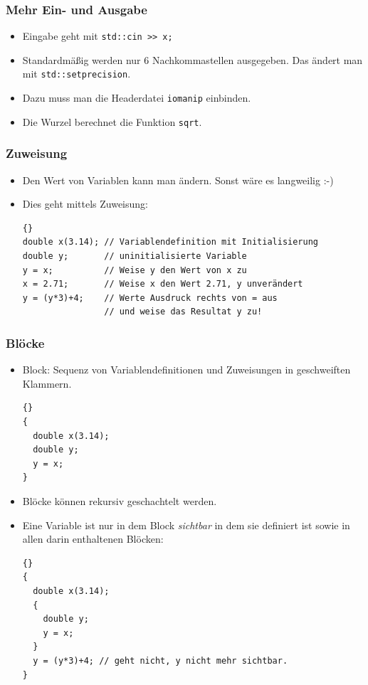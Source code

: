 \documentclass[ignorenonframetext,12pt]{beamer}
\theoremstyle{definition}
\theoremstyle{definition}
\begin{document}
\begin{frame}[fragile]
\frametitle{Mehr Ein- und Ausgabe}

\begin{itemize}
\item Eingabe geht mit \lstinline{std::cin >> x;}
\item Standardmäßig werden nur 6 Nachkommastellen ausgegeben. Das
  ändert man mit \lstinline{std::setprecision}.
\item Dazu muss man die Headerdatei \lstinline{iomanip} einbinden.
\item Die Wurzel berechnet die Funktion \lstinline{sqrt}.
\end{itemize}
\end{frame}

\begin{frame}[fragile]
\frametitle{Zuweisung}
\begin{itemize}
\item Den Wert von Variablen kann man ändern. Sonst wäre es langweilig
  :-)
\item Dies geht mittels Zuweisung:
{\scriptsize\begin{lstlisting}{}
double x(3.14); // Variablendefinition mit Initialisierung
double y;       // uninitialisierte Variable
y = x;          // Weise y den Wert von x zu
x = 2.71;       // Weise x den Wert 2.71, y unverändert
y = (y*3)+4;    // Werte Ausdruck rechts von = aus
                // und weise das Resultat y zu!
\end{lstlisting}}
\end{itemize}
\end{frame}

\begin{frame}[fragile]
\frametitle{Blöcke}
\begin{itemize}
\item Block: Sequenz von Variablendefinitionen und Zuweisungen in
  geschweiften Klammern.
{\scriptsize\begin{lstlisting}{}
{
  double x(3.14);
  double y;
  y = x;
}
\end{lstlisting}}
\item Blöcke können rekursiv geschachtelt werden.
\item Eine Variable ist nur in dem Block \textsl{sichtbar} in dem sie
  definiert ist sowie in allen darin enthaltenen Blöcken:
{\scriptsize\begin{lstlisting}{}
{
  double x(3.14);
  {
    double y;
    y = x;
  }
  y = (y*3)+4; // geht nicht, y nicht mehr sichtbar.
}
\end{lstlisting}}
\end{itemize}
\end{frame}
\end{document}
